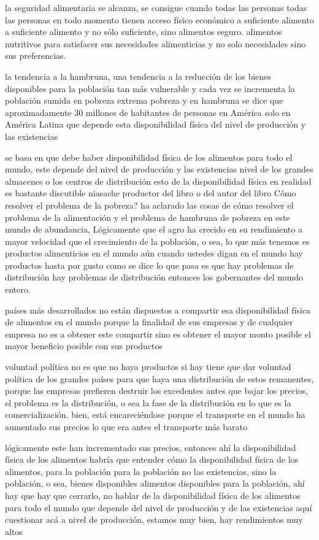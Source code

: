 \documentclass[
  letterpaper,
  DIV=11,
  numbers=noendperiod]{scrartcl}
\begin{document}
la seguridad alimentaria se alcanza, se consigue cuando todas las
personas todas las personas en todo momento tienen acceso físico
económico a suficiente alimento a suficiente alimento y no sólo
suficiente, sino alimentos seguro. alimentos nutritivos para satisfacer
sus necesidades alimenticias y no solo necesidades sino sus
preferencias.

la tendencia a la hambruna, una tendencia a la reducción de los bienes
disponibles para la población tan más vulnerable y cada vez se
incrementa la población sumida en pobreza extrema pobreza y en hambruna
se dice que aproximadamente 30 millones de habitantes de personas en
América solo en América Latina que depende esta disponibilidad física
del nivel de producción y las existencias

se basa en que debe haber disponibilidad física de los alimentos para
todo el mundo, este depende del nivel de producción y las existencias
nivel de los grandes almacenes o los centros de distribución esto de la
disponibilidad física en realidad es bastante discutible niasache
productor del libro o del autor del libro Cómo resolver el problema de
la pobreza? ha aclarado las cosas de cómo resolver el problema de la
alimentación y el problema de hambruna de pobreza en este mundo de
abundancia, Lógicamente que el agro ha crecido en su rendimiento a mayor
velocidad que el crecimiento de la población, o sea, lo que más tenemos
es productos alimenticios en el mundo aún cuando ustedes digan en el
mundo hay productos hasta por gusto como se dice lo que pasa es que hay
problemas de distribución hay problemas de distribución entonces los
gobernantes del mundo entero.

países más desarrollados no están dispuestos a compartir esa
disponibilidad física de alimentos en el mundo porque la finalidad de
sus empresas y de cualquier empresa no es a obtener este compartir sino
es obtener el mayor monto posible el mayor beneficio posible con sus
productos

voluntad política no es que no haya productos si hay tiene que dar
voluntad política de los grandes países para que haya una distribución
de estos remanentes, porque las empresas prefieren destruir los
excedentes antes que bajar los precios, el problema es la distribución,
o sea la fase de la distribución en lo que es la comercialización. bien,
está encareciéndose porque el transporte en el mundo ha aumentado sus
precios lo que era antes el transporte más barato

lógicamente este han incrementado sus precios, entonces ahí la
disponibilidad física de los alimentos habría que entender cómo la
disponibilidad física de los alimentos, para la población para la
población no las existencias, sino la población, o sea, bienes
disponibles alimentos disponibles para la población, ahí hay que hay que
cerrarlo, no hablar de la disponibilidad física de los alimentos para
todo el mundo que depende del nivel de producción y de las existencias
aquí cuestionar acá a nivel de producción, estamos muy bien, hay
rendimientos muy altos
\end{document}
